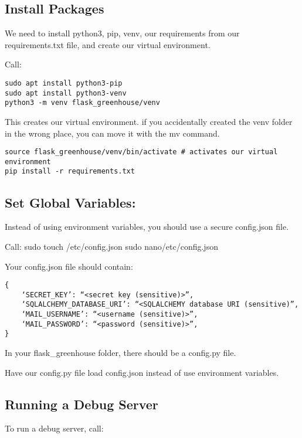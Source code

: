 \subsection{Install Packages}\label{install-packages}

We need to install python3, pip, venv, our requirements from our
requirements.txt file, and create our virtual environment.

Call:

\begin{verbatim}
sudo apt install python3-pip
sudo apt install python3-venv
python3 -m venv flask_greenhouse/venv 
\end{verbatim}

This creates our virtual environment. if you accidentally created the
venv folder in the wrong place, you can move it with the mv command.

\begin{verbatim}
source flask_greenhouse/venv/bin/activate # activates our virtual environment
pip install -r requirements.txt
\end{verbatim}

\subsection{Set Global Variables:}\label{set-global-variables}

Instead of using environment variables, you should use a secure
config.json file.

Call: sudo touch /etc/config.json sudo nano/etc/config.json

Your config.json file should contain:

\begin{verbatim}
{
    ‘SECRET_KEY’: “<secret key (sensitive)>”,
    ‘SQLALCHEMY_DATABASE_URI’: “<SQLALCHEMY database URI (sensitive)”,
    ‘MAIL_USERNAME’: “<username (sensitive)>”,
    ‘MAIL_PASSWORD’: “<password (sensitive)>”,
}
\end{verbatim}

In your flask\_greenhouse folder, there should be a config.py file.

Have our config.py file load config.json instead of use environment
variables.

\subsection{Running a Debug Server}\label{running-a-debug-server}

To run a debug server, call:

